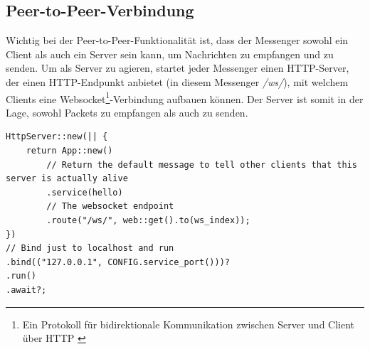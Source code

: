 \documentclass[a4paper,ngerman, headheight=28pt,12pt, footheight=27pt]{scrartcl}
\newcommand{\vcite}[1]{\cite[vgl.][]{#1}}
\begin{document}
\subsection{Peer-to-Peer-Verbindung}
Wichtig bei der Peer-to-Peer-Funktionalität ist, dass der Messenger sowohl ein Client als auch ein Server sein kann, um Nachrichten zu empfangen und zu senden.
Um als Server zu agieren, startet jeder Messenger einen HTTP-Server, der einen HTTP-Endpunkt anbietet (in diesem Messenger \textit{/ws/}), mit welchem Clients eine Websocket\footnote{Ein Protokoll für bidirektionale Kommunikation zwischen Server und Client über HTTP \vcite{WebsocketDef}}-Verbindung aufbauen können. Der Server ist somit in der Lage, sowohl Packets zu empfangen als auch zu senden.
\begin{verbatim}
HttpServer::new(|| {
    return App::new()
        // Return the default message to tell other clients that this server is actually alive
        .service(hello)
        // The websocket endpoint
        .route("/ws/", web::get().to(ws_index));
})
// Bind just to localhost and run
.bind(("127.0.0.1", CONFIG.service_port()))?
.run()
.await?;
\end{verbatim}
\end{document}
